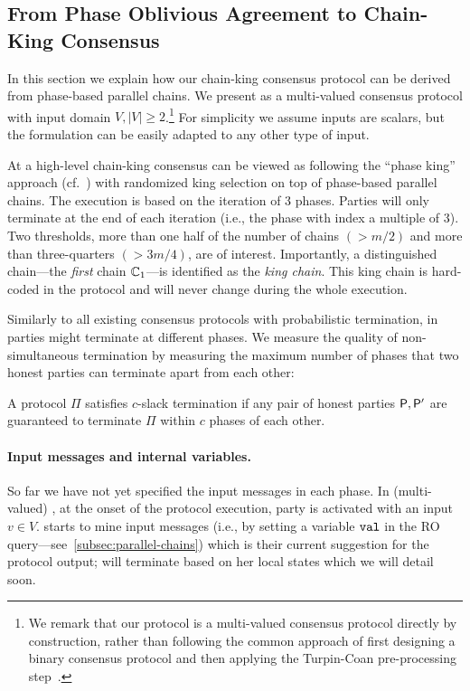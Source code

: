 \subsection{From Phase Oblivious Agreement to Chain-King Consensus}
\label{subsec:chain-king-consensus}

In this section we explain how our chain-king consensus protocol can be derived from phase-based parallel chains.
%
We present \chainKingConsensus as a multi-valued consensus protocol with input domain $V, |V| \geq 2$.\footnote{We remark that our protocol is a multi-valued consensus protocol directly by construction, rather than following the common approach of first designing a binary consensus protocol and then applying the Turpin-Coan pre-processing step~\cite{InfProcessLett:TurCoa84}.}
%
For simplicity we assume inputs are scalars, but the formulation can be easily adapted to any other type of input.

At a high-level chain-king consensus can be viewed as following the ``phase king'' approach (cf.~\cite{ALP:BerGar89,FOCS:BerGarPer89}) with randomized king selection on top of phase-based parallel chains.
%
The execution is based on the iteration of 3 phases.
%
Parties will only terminate at the end of each iteration (i.e., the phase with index a multiple of 3).
%
Two thresholds, more than one half of the number of chains $( > m / 2)$ and more than three-quarters $( > 3m / 4)$, are of interest.
%
Importantly, a distinguished chain---the \emph{first} chain $\mathbb{C}_1$---is identified as the \emph{king chain}.
%
This king chain is hard-coded in the protocol and will never change during the whole execution.

Similarly to all existing consensus protocols with probabilistic termination, in \chainKingConsensus parties might terminate at different phases.
%
We measure the quality of non-simultaneous termination by measuring the maximum number of phases that two honest parties can terminate apart from each other:

\begin{definition} \label{def:slack-termination}
    A protocol $\Pi$ satisfies $c$-slack termination if any pair of honest parties $\mathsf{P}, \mathsf{P}'$ are guaranteed to terminate $\Pi$ within $c$ phases of each other.
\end{definition}

\paragraph{Input messages and internal variables.}
%
So far we have not yet specified the input messages in each phase.
%
In (multi-valued) \chainKingConsensus, at the onset of the protocol execution, party \party is activated with an input $v \in V$.
%
\party starts to mine input messages (i.e., by setting a variable $\mathtt{val}$ in the RO query---see~\cref{subsec:parallel-chains}) which is their current suggestion for the protocol output; \party will terminate based on her local states which we will detail soon.

